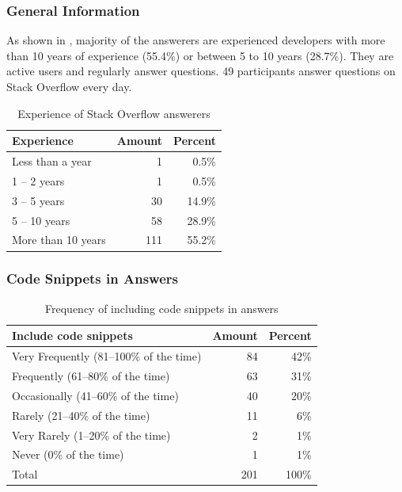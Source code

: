 \documentclass[10pt,journal,compsoc]{IEEEtran}
\begin{document}
\subsubsection{General Information}
As shown in , majority of the answerers are experienced
developers with more than 10 years of experience (55.4\%) or between 5 to 10
years (28.7\%). They are active users and regularly answer questions. 49
participants answer questions on Stack Overflow every day.

\begin{table}
	\centering
	\caption{Experience of Stack Overflow answerers}
	\label{tab:survey_exp}
	\begin{tabular}{lrr}
		\toprule
		Experience & Amount & Percent \\
		\midrule
		Less than a year & 1 & 0.5\% \\
		1 -- 2 years & 1 & 0.5\% \\
		3 -- 5 years & 30 & 14.9\% \\
		5 -- 10 years & 58 & 28.9\% \\
		More than 10 years	& 111 & 55.2\% \\
		\bottomrule
	\end{tabular}
\end{table}

\subsubsection{Code Snippets in Answers} 

\begin{table}
	\centering
	\caption{Frequency of including code snippets in answers}
	\label{tab:survey_code_snippet_frequency}
	\begin{tabular}{lrr}
		\toprule
		Include code snippets & Amount & Percent \\
		\midrule
		Very Frequently (81--100\% of the time)	& 84 & 42\% \\
		Frequently (61--80\% of the time) &	63 & 31\% \\
		Occasionally (41--60\% of the time) & 40 & 20\% \\
		Rarely (21--40\% of the time) & 11 & 6\% \\
		Very Rarely (1--20\% of the time) & 2 & 1\% \\
		Never (0\% of the time) & 1 & 1\% \\
		\midrule
		Total & 201 & 100\% \\
		\bottomrule
	\end{tabular}
\end{table}
\end{document}
